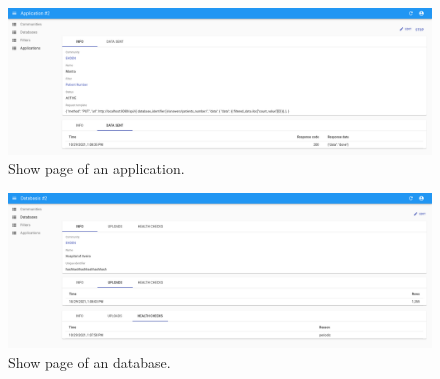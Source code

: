 \documentclass[11pt,a4paper,openright,twoside,onecolumn]{memoir}
\begin{document}
\begin{figure}[H]
    \center
    \includegraphics[width=\textwidth]{figs/admin-portal/application-show}
    \caption{Show page of an application.}
    \label{fig:admin-portal/application-show}
\end{figure}

\begin{figure}[H]
    \center
    \includegraphics[width=\textwidth]{figs/admin-portal/database-show}
    \caption{Show page of an database.}
    \label{fig:admin-portal/database-show}
\end{figure}
\end{document}
